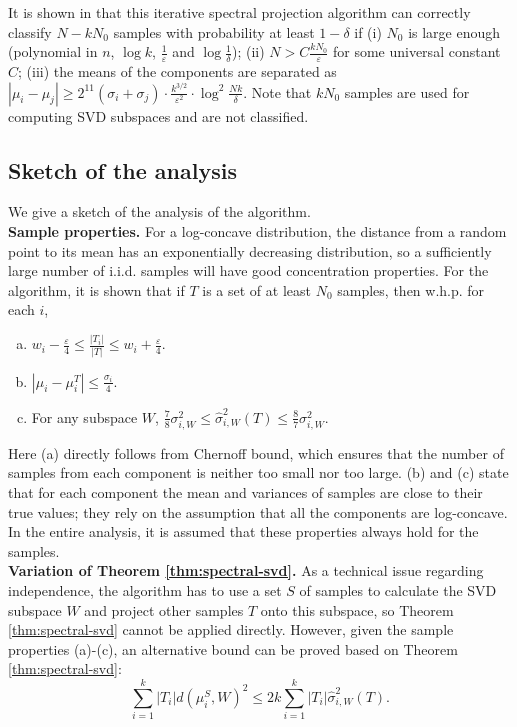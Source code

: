 \documentclass[11pt,letter]{article}
\begin{document}
It is shown in \cite{Kannan08spectral} that this iterative spectral projection algorithm can correctly classify $N-kN_0$ samples with probability at least $1-\delta$ if (i) $N_0$ is large enough (polynomial in $n$, $\log k$, $\frac1\varepsilon$ and $\log\frac1\delta$); (ii) $N>C\frac{kN_0}{\varepsilon}$ for some universal constant $C$; (iii) the means of the components are separated as $|\mu_i - \mu_j| \ge 2^{11} (\sigma_i+\sigma_j)\cdot \frac{k^{3/2}}{\varepsilon^2} \cdot \log^2\frac{Nk}{\delta}$. Note that $kN_0$ samples are used for computing SVD subspaces and are not classified.

\subsection{Sketch of the analysis}

We give a sketch of the analysis of the algorithm.\\

\textbf{Sample properties.}
For a log-concave distribution, the distance from a random point to its mean has an exponentially decreasing distribution, so a sufficiently large number of i.i.d. samples will have good concentration properties. For the algorithm, it is shown that if $T$ is a set of at least $N_0$ samples, then w.h.p. for each $i$,
\begin{enumerate}[(a)]
\item $w_i - \frac{\varepsilon}{4} \le \frac{|T_i|}{|T|} \le w_i + \frac{\varepsilon}{4}$.
\item $|\mu_i - \mu_i^T| \le \frac{\sigma_i}{4}$.
\item For any subspace $W$, $\frac78 \sigma_{i, W}^2 \le \hat \sigma_{i, W}^2(T) \le \frac87 \sigma_{i, W}^2$.
\end{enumerate}
Here (a) directly follows from Chernoff bound, which ensures that the number of samples from each component is neither too small nor too large. (b) and (c) state that for each component the mean and variances of samples are close to their true values; they rely on the assumption that all the components are log-concave.
In the entire analysis, it is assumed that these properties always hold for the samples.\\

\textbf{Variation of Theorem \ref{thm:spectral-svd}.}
As a technical issue regarding independence, the algorithm has to use a set $S$ of samples to calculate the SVD subspace $W$ and project other samples $T$ onto this subspace, so Theorem \ref{thm:spectral-svd} cannot be applied directly.
However, given the sample properties (a)-(c), an alternative bound can be proved based on Theorem \ref{thm:spectral-svd}:
\begin{equation} \label{eqn:thm1-variation}
\sum_{i=1}^k |T_i| d(\mu_i^S, W)^2 \le 2k \sum_{i=1}^k |T_i| \hat \sigma_{i, W}^2(T).
\end{equation}
\end{document}
